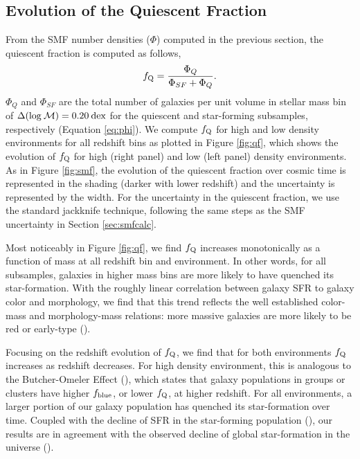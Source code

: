 \documentclass{emulateapj}
\begin{document}
\subsection{Evolution of the Quiescent Fraction} \label{sec:qfevol}
From the SMF number densities ($\Phi$) computed in the previous section, the quiescent fraction is computed as follows, 
\begin{equation}
f_{\rm{Q}} = \frac{\Phi_{Q}}{\Phi_{SF}+\Phi_{Q}}.
\end{equation}
$\Phi_{Q}$ and $\Phi_{SF}$ are the total number of galaxies per unit volume in stellar mass bin of $\Delta(\rm{log} \: \mathcal{M}) = 0.20 \: dex$ for the quiescent and star-forming subsamples, respectively (Equation \ref{eq:phi}). We compute $f_{\rm{Q}}$ for high and low density environments for all redshift bins as plotted in Figure \ref{fig:qf}, which shows the evolution of $f_{\rm{Q}}$ for high (right panel) and low (left panel) density environments. As in Figure \ref{fig:smf}, the evolution of the quiescent fraction over cosmic time is represented in the shading (darker with lower redshift) and the uncertainty is represented by the width. For the uncertainty in the quiescent fraction, we use the standard jackknife technique, following the same steps as the SMF uncertainty in Section \ref{sec:smfcalc}. 

Most noticeably in Figure \ref{fig:qf}, we find $f_{\rm{Q}}$ increases monotonically as a function of mass at all redshift bin and environment. In other words, for all subsamples, galaxies in higher mass bins are more likely to have quenched its star-formation. With the roughly linear correlation between galaxy SFR to galaxy color and morphology, we find that this trend reflects the well established color-mass and morphology-mass relations: more massive galaxies are more likely to be red or early-type (\citealt{blanton09a}). 

Focusing on the redshift evolution of $f_{\rm{Q}}$, we find that for both environments $f_{\rm{Q}}$ increases as redshift decreases. For high density environment, this is analogous to the Butcher-Omeler Effect (\citealt{Butcher:1984aa}), which states that galaxy populations in groups or clusters have higher $f_{\rm{blue}}$, or lower $f_{\rm{Q}}$, at higher redshift. For all environments, a larger portion of our galaxy population has quenched its star-formation over time. Coupled with the decline of SFR in the star-forming population (\citealt{Noeske:2007aa, cooper08a}), our results are in agreement with the observed decline of global star-formation in the universe (\citealt{hopkins06a}). %
\end{document}
